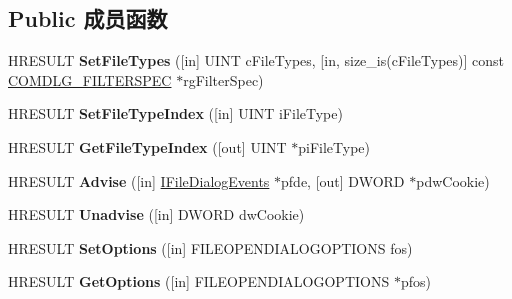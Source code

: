 \subsection*{Public 成员函数}
\begin{DoxyCompactItemize}
\item 
\mbox{\label{interface_i_file_dialog_abefd12715f0352985e267b1861c8d3f6}} 
H\+R\+E\+S\+U\+LT {\bfseries Set\+File\+Types} (\mbox{[}in\mbox{]} U\+I\+NT c\+File\+Types, \mbox{[}in, size\+\_\+is(c\+File\+Types)\mbox{]} const \hyperlink{struct___c_o_m_d_l_g___f_i_l_t_e_r_s_p_e_c}{C\+O\+M\+D\+L\+G\+\_\+\+F\+I\+L\+T\+E\+R\+S\+P\+EC} $\ast$rg\+Filter\+Spec)
\item 
\mbox{\label{interface_i_file_dialog_aa49cb358182291867b149c7f83b117f8}} 
H\+R\+E\+S\+U\+LT {\bfseries Set\+File\+Type\+Index} (\mbox{[}in\mbox{]} U\+I\+NT i\+File\+Type)
\item 
\mbox{\label{interface_i_file_dialog_a17c2b0d004a793ca6c5dc3c738b8b4a6}} 
H\+R\+E\+S\+U\+LT {\bfseries Get\+File\+Type\+Index} (\mbox{[}out\mbox{]} U\+I\+NT $\ast$pi\+File\+Type)
\item 
\mbox{\label{interface_i_file_dialog_abf23276c86e4566dea2f89d239946d04}} 
H\+R\+E\+S\+U\+LT {\bfseries Advise} (\mbox{[}in\mbox{]} \hyperlink{interface_i_file_dialog_events}{I\+File\+Dialog\+Events} $\ast$pfde, \mbox{[}out\mbox{]} D\+W\+O\+RD $\ast$pdw\+Cookie)
\item 
\mbox{\label{interface_i_file_dialog_a07beda5f05d367d34759f2e9c68972b4}} 
H\+R\+E\+S\+U\+LT {\bfseries Unadvise} (\mbox{[}in\mbox{]} D\+W\+O\+RD dw\+Cookie)
\item 
\mbox{\label{interface_i_file_dialog_aa6b2ca1c0aa1f92d03371ba5b1da959e}} 
H\+R\+E\+S\+U\+LT {\bfseries Set\+Options} (\mbox{[}in\mbox{]} F\+I\+L\+E\+O\+P\+E\+N\+D\+I\+A\+L\+O\+G\+O\+P\+T\+I\+O\+NS fos)
\item 
\mbox{\label{interface_i_file_dialog_afd95ff9f5839a8ca30548b588ea53270}} 
H\+R\+E\+S\+U\+LT {\bfseries Get\+Options} (\mbox{[}in\mbox{]} F\+I\+L\+E\+O\+P\+E\+N\+D\+I\+A\+L\+O\+G\+O\+P\+T\+I\+O\+NS $\ast$pfos)

\end{DoxyCompactItemize}

